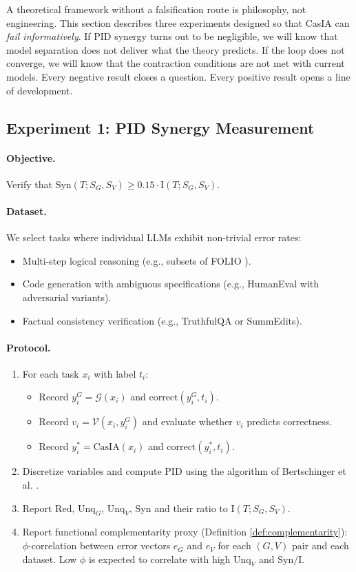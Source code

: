 \documentclass[11pt,a4paper]{article}
\theoremstyle{remark}
\newcommand{\Syn}{\mathrm{Syn}}
\newcommand{\Red}{\mathrm{Red}}
\newcommand{\Unq}{\mathrm{Unq}}
\newcommand{\MI}{\mathrm{I}}
\begin{document}
A theoretical framework without a falsification route is philosophy, not engineering. This section describes three experiments designed so that CasIA can \emph{fail informatively}. If PID synergy turns out to be negligible, we will know that model separation does not deliver what the theory predicts. If the loop does not converge, we will know that the contraction conditions are not met with current models. Every negative result closes a question. Every positive result opens a line of development.

\subsection{Experiment 1: PID Synergy Measurement}

\paragraph{Objective.} Verify that $\Syn(T; S_G, S_V) \geq 0.15 \cdot \MI(T; S_G, S_V)$.

\paragraph{Dataset.} We select tasks where individual LLMs exhibit non-trivial error rates:
\begin{itemize}
  \item Multi-step logical reasoning (e.g., subsets of FOLIO \cite{han2022folio}).
  \item Code generation with ambiguous specifications (e.g., HumanEval with adversarial variants).
  \item Factual consistency verification (e.g., TruthfulQA \cite{lin2022truthfulqa} or SummEdits).
\end{itemize}

\paragraph{Protocol.}
\begin{enumerate}
  \item For each task $x_i$ with label $t_i$:
  \begin{itemize}
    \item Record $y_i^G = \mathcal{G}(x_i)$ and $\text{correct}(y_i^G, t_i)$.
    \item Record $v_i = \mathcal{V}(x_i, y_i^G)$ and evaluate whether $v_i$ predicts correctness.
    \item Record $y_i^* = \text{CasIA}(x_i)$ and $\text{correct}(y_i^*, t_i)$.
  \end{itemize}
  \item Discretize variables and compute PID using the algorithm of Bertschinger et al. \cite{bertschinger2014pid}.
  \item Report $\Red$, $\Unq_G$, $\Unq_V$, $\Syn$ and their ratio to $\MI(T; S_G, S_V)$.
  \item Report functional complementarity proxy (Definition \ref{def:complementarity}): $\phi$-correlation between error vectors $e_G$ and $e_V$ for each $(G, V)$ pair and each dataset. Low $\phi$ is expected to correlate with high $\Unq_V$ and $\Syn/\MI$.
\end{enumerate}
\end{document}

